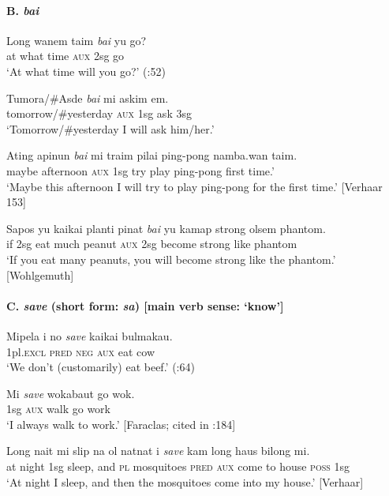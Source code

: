 \paragraph*{B. \textit{bai}}
\ea
\gll Long  wanem  taim  \textit{bai}  yu  go?\\
at  what  time  \textsc{aux}  2sg  go\\
\glt ‘At what time will you go?’  (\citealt{Dutton1973}:52)
\z

\ea
\gll Tumora/\#Asde  \textit{bai}  mi  askim  em.\\
tomorrow/\#yesterday  \textsc{aux}  1sg  ask  3sg\\
\glt ‘Tomorrow/\#yesterday I will ask him/her.’
\z

\ea
\gll Ating  apinun  \textit{bai}  mi  traim  pilai  ping-pong  namba.wan  taim.\\
maybe  afternoon  \textsc{aux}  1sg  try  play  ping-pong  first  time.’\\
\glt ‘Maybe this afternoon I will try to play ping-pong for the first time.’  [Verhaar 153]
\z

\ea
\gll   Sapos  yu  kaikai  planti  pinat  \textit{bai}  yu  kamap  strong  olsem  phantom.\\
if  2sg  eat  much  peanut  \textsc{aux}  2sg  become  strong  like  phantom\\
\glt ‘If you eat many peanuts, you will become strong like the phantom.’ [Wohlgemuth]
\z

\paragraph*{C. \textit{save} (short form: \textit{sa})  [main verb sense: ‘know’]}
\ea
\gll Mipela  i  no  \textit{save}  kaikai  bulmakau.\\
1pl.\textsc{excl}  \textsc{pred}  \textsc{neg}  \textsc{aux}  eat  cow\\
\glt ‘We don’t (customarily) eat beef.’  (\citealt{Dutton1973}:64)
\z

\ea
\gll Mi  \textit{save}  wokabaut  go  wok.\\
1sg  \textsc{aux}  walk  go  work\\
\glt ‘I always walk to work.’  [Faraclas; cited in \citealt{Holm2000}:184]
\z

\ea
\gll  Long  nait  mi  slip  na  ol  natnat  i  \textit{save}  kam  long  haus  bilong  mi.\\
at  night  1sg  sleep,  and  \textsc{pl}  mosquitoes  \textsc{pred}  \textsc{aux}  come  to  house  \textsc{poss}  1sg\\
\glt ‘At night I sleep, and then the mosquitoes come into my house.’  [Verhaar]
\z

